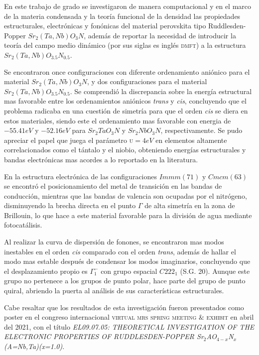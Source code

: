 En este trabajo de grado se investigaron de manera computacional y en el marco de la materia condensada y la teoría funcional de la densidad las propiedades estructurales, electrónicas y fonónicas del material perovskita tipo Ruddlesden-Popper $Sr_{2}(Ta,Nb)O_{3}N$, además de reportar la necesidad de introducir la teoría del campo medio dinámico (por sus siglas es inglés \textsc{dmft}) a la estructura $Sr_{2}(Ta,Nb)O_{3.5}N_{0.5}$.

Se encontraron once configuraciones con diferente ordenamiento aniónico para el material $Sr_{2}(Ta,Nb)O_{3}N$, y dos configuraciones para el material $Sr_{2}(Ta,Nb)O_{3.5}N_{0.5}$.  Se comprendió la discrepancia sobre la energía estructural mas favorable entre los ordenamientos aniónicos \emph{trans} y \emph{cis}, concluyendo que el problema radicaba en una cuestión de simetría para que el orden \emph{cis} se diera en estos materiales, siendo este el ordenamiento mas favorable con energia de $-55.41eV$ y $-52.16eV$ para $Sr_{2}TaO_{3}N$ y $Sr_{2}NbO_{3}N$, respectivamente. Se pudo apreciar el papel que juega el parámetro \textsc{u}$=4eV$ en elementos altamente correlacionados como el tántalo y el niobio, obteniendo energías estructurales y bandas electrónicas mas acordes a lo reportado en la literatura.

En la estructura electrónica de las configuraciones $Immm(71)$ y $Cmcm(63)$ se encontró el posicionamiento del metal de transición en las bandas de conducción, mientras que las bandas de valencia son ocupadas por el nitrógeno, disminuyendo la  brecha directa en el punto $\Gamma$ de alta simetría en la zona de Brillouin, lo que hace a este material favorable para la división de agua mediante fotocatálisis.

Al realizar la curva de dispersión de fonones, se encontraron mas modos inestables en el orden \emph{cis} comparado con el orden \emph{trans}, además de hallar el modo mas estable después de condensar los modos imaginarios, concluyendo que el desplazamiento propio es $\Gamma_{1}^{-}$ con grupo espacial $C222_{1}$ (S.G. 20). Aunque este grupo no pertenece a los grupos de punto polar, hace parte del grupo de punto quiral, abriendo la puerta al análisis de sus características estructurales.

Cabe resaltar que los resultados de esta investigación fueron presentados como poster en el congreso internacional \textsc{virtual mrs spring meeting $\&$ exhibit} en abril del 2021, con el título \textit{EL09.07.05: THEORETICAL INVESTIGATION OF THE ELECTRONIC PROPERTIES OF RUDDLESDEN-POPPER Sr$_{2}$AO$_{4-x}$N$_{x}$(A=Nb,Ta)(x=1.0)}.






